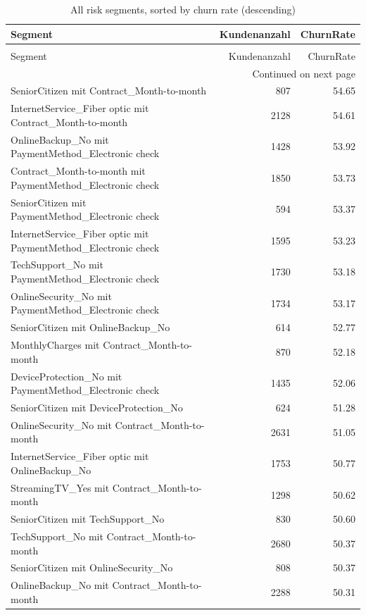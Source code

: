 \documentclass[a4paper,11pt]{article}
\begin{document}
\begin{longtable}{p{9cm}rr}
\caption{All risk segments, sorted by churn rate (descending)} \label{tab:risk-segments-all} \\
\toprule
Segment & Kundenanzahl & ChurnRate \\
\midrule
\endfirsthead
\caption[]{All risk segments, sorted by churn rate (descending)} \\
\toprule
Segment & Kundenanzahl & ChurnRate \\
\midrule
\endhead
\midrule
\multicolumn{3}{r}{Continued on next page} \\
\midrule
\endfoot
\bottomrule
\endlastfoot
SeniorCitizen mit Contract\_Month-to-month & 807 & 54.65 \\
InternetService\_Fiber optic mit Contract\_Month-to-month & 2128 & 54.61 \\
OnlineBackup\_No mit PaymentMethod\_Electronic check & 1428 & 53.92 \\
Contract\_Month-to-month mit PaymentMethod\_Electronic check & 1850 & 53.73 \\
SeniorCitizen mit PaymentMethod\_Electronic check & 594 & 53.37 \\
InternetService\_Fiber optic mit PaymentMethod\_Electronic check & 1595 & 53.23 \\
TechSupport\_No mit PaymentMethod\_Electronic check & 1730 & 53.18 \\
OnlineSecurity\_No mit PaymentMethod\_Electronic check & 1734 & 53.17 \\
SeniorCitizen mit OnlineBackup\_No & 614 & 52.77 \\
MonthlyCharges mit Contract\_Month-to-month & 870 & 52.18 \\
DeviceProtection\_No mit PaymentMethod\_Electronic check & 1435 & 52.06 \\
SeniorCitizen mit DeviceProtection\_No & 624 & 51.28 \\
OnlineSecurity\_No mit Contract\_Month-to-month & 2631 & 51.05 \\
InternetService\_Fiber optic mit OnlineBackup\_No & 1753 & 50.77 \\
StreamingTV\_Yes mit Contract\_Month-to-month & 1298 & 50.62 \\
SeniorCitizen mit TechSupport\_No & 830 & 50.60 \\
TechSupport\_No mit Contract\_Month-to-month & 2680 & 50.37 \\
SeniorCitizen mit OnlineSecurity\_No & 808 & 50.37 \\
OnlineBackup\_No mit Contract\_Month-to-month & 2288 & 50.31 \\

\end{longtable}
\end{document}
